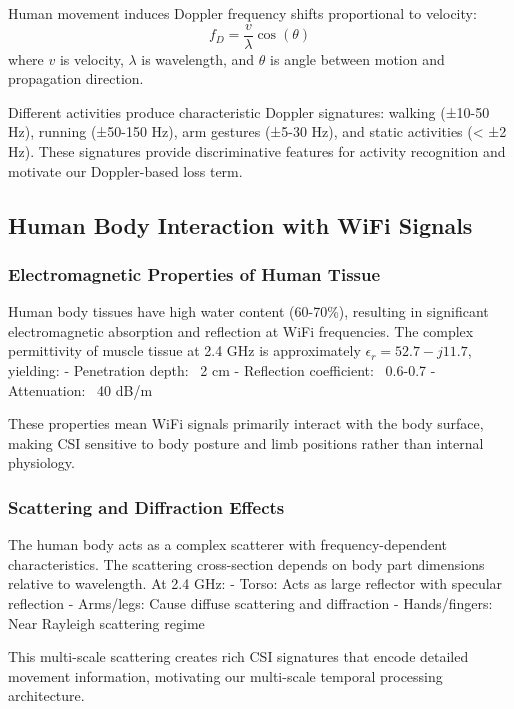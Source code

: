 \documentclass[10pt,journal,compsoc]{IEEEtran}
\begin{document}
Human movement induces Doppler frequency shifts proportional to velocity:
\begin{equation}
f_D = \frac{v}{\lambda} \cos(\theta)
\end{equation}
where $v$ is velocity, $\lambda$ is wavelength, and $\theta$ is angle between motion and propagation direction.

Different activities produce characteristic Doppler signatures: walking (±10-50 Hz), running (±50-150 Hz), arm gestures (±5-30 Hz), and static activities (< ±2 Hz). These signatures provide discriminative features for activity recognition and motivate our Doppler-based loss term.

\subsection{Human Body Interaction with WiFi Signals}

\subsubsection{Electromagnetic Properties of Human Tissue}

Human body tissues have high water content (60-70\%), resulting in significant electromagnetic absorption and reflection at WiFi frequencies. The complex permittivity of muscle tissue at 2.4 GHz is approximately $\epsilon_r = 52.7 - j11.7$, yielding:
- Penetration depth: ~2 cm
- Reflection coefficient: ~0.6-0.7
- Attenuation: ~40 dB/m

These properties mean WiFi signals primarily interact with the body surface, making CSI sensitive to body posture and limb positions rather than internal physiology.

\subsubsection{Scattering and Diffraction Effects}

The human body acts as a complex scatterer with frequency-dependent characteristics. The scattering cross-section depends on body part dimensions relative to wavelength. At 2.4 GHz:
- Torso: Acts as large reflector with specular reflection
- Arms/legs: Cause diffuse scattering and diffraction
- Hands/fingers: Near Rayleigh scattering regime

This multi-scale scattering creates rich CSI signatures that encode detailed movement information, motivating our multi-scale temporal processing architecture.
\end{document}
